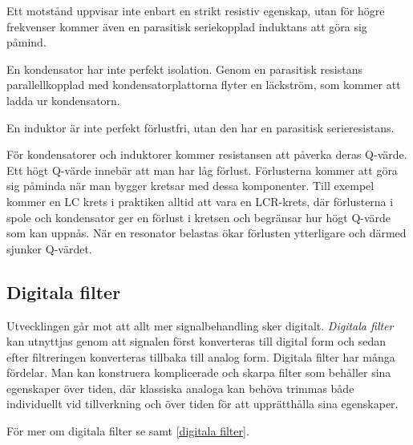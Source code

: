 Ett motstånd uppvisar inte enbart en strikt resistiv egenskap, utan för högre
frekvenser kommer även en parasitisk seriekopplad induktans att göra sig påmind.

En kondensator har inte perfekt isolation.
Genom en parasitisk resistans parallellkopplad med kondensatorplattorna flyter
en läckström, som kommer att ladda ur kondensatorn.

En induktor är inte perfekt förlustfri, utan den har en parasitisk serieresistans.

För kondensatorer och induktorer kommer resistansen att påverka deras Q-värde.
Ett högt Q-värde innebär att man har låg förlust.
Förlusterna kommer att göra sig påminda när man bygger kretsar med dessa
komponenter.
Till exempel kommer en LC krets i praktiken alltid att vara en LCR-krets, där
förlusterna i spole och kondensator ger en förlust i kretsen och begränsar hur
högt Q-värde som kan uppnås.
När en resonator belastas ökar förlusten ytterligare och därmed sjunker Q-värdet.


\subsection{Digitala filter}

Utvecklingen går mot att allt mer signalbehandling sker digitalt. 
\emph{Digitala filter} kan utnyttjas genom att signalen först konverteras till
digital form och sedan efter filtreringen konverteras tillbaka till analog form.
Digitala filter har många fördelar.
Man kan konstruera komplicerade och skarpa filter som behåller sina egenskaper
över tiden, där klassiska analoga kan behöva trimmas både individuellt vid
tillverkning och över tiden för att upprätthålla sina egenskaper.

För mer om digitala filter se  samt \ref{digitala filter}.
